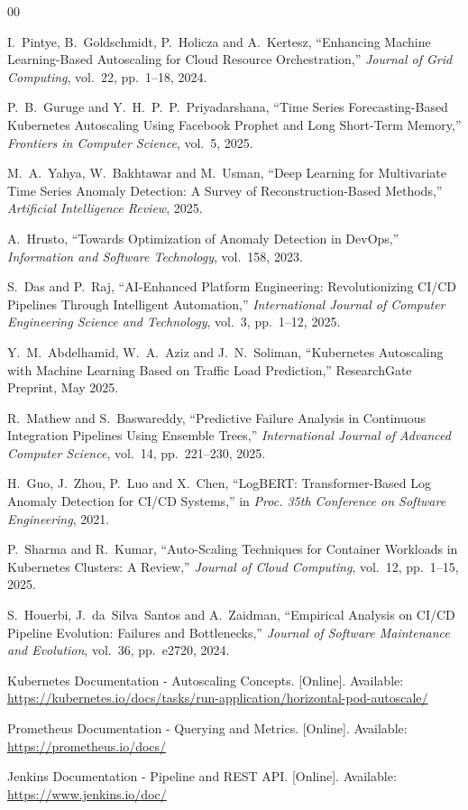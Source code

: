 \documentclass[12pt]{report}
\begin{document}
\begin{thebibliography}{00}

I.~Pintye, B.~Goldschmidt, P.~Holicza and A.~Kertesz,
``Enhancing Machine Learning-Based Autoscaling for Cloud Resource Orchestration,''
\textit{Journal of Grid Computing}, vol.~22, pp.~1--18, 2024.

P.~B.~Guruge and Y.~H.~P.~P.~Priyadarshana,
``Time Series Forecasting-Based Kubernetes Autoscaling Using Facebook Prophet and Long Short-Term Memory,''
\textit{Frontiers in Computer Science}, vol.~5, 2025.

M.~A.~Yahya, W.~Bakhtawar and M.~Usman,
``Deep Learning for Multivariate Time Series Anomaly Detection: A Survey of Reconstruction-Based Methods,''
\textit{Artificial Intelligence Review}, 2025.

A.~Hrusto,
``Towards Optimization of Anomaly Detection in DevOps,''
\textit{Information and Software Technology}, vol.~158, 2023.

S.~Das and P.~Raj,
``AI-Enhanced Platform Engineering: Revolutionizing CI/CD Pipelines Through Intelligent Automation,''
\textit{International Journal of Computer Engineering Science and Technology}, vol.~3, pp.~1--12, 2025.

Y.~M.~Abdelhamid, W.~A.~Aziz and J.~N.~Soliman,
``Kubernetes Autoscaling with Machine Learning Based on Traffic Load Prediction,''
ResearchGate Preprint, May 2025.

R.~Mathew and S.~Baswareddy,
``Predictive Failure Analysis in Continuous Integration Pipelines Using Ensemble Trees,''
\textit{International Journal of Advanced Computer Science}, vol.~14, pp.~221--230, 2025.

H.~Guo, J.~Zhou, P.~Luo and X.~Chen,
``LogBERT: Transformer-Based Log Anomaly Detection for CI/CD Systems,''
in \textit{Proc. 35th Conference on Software Engineering}, 2021.

P.~Sharma and R.~Kumar,
``Auto-Scaling Techniques for Container Workloads in Kubernetes Clusters: A Review,''
\textit{Journal of Cloud Computing}, vol.~12, pp.~1--15, 2025.

S.~Houerbi, J.~da~Silva~Santos and A.~Zaidman,
``Empirical Analysis on CI/CD Pipeline Evolution: Failures and Bottlenecks,''
\textit{Journal of Software Maintenance and Evolution}, vol.~36, pp.~e2720, 2024.

Kubernetes Documentation -  Autoscaling Concepts.
[Online]. Available: \url{https://kubernetes.io/docs/tasks/run-application/horizontal-pod-autoscale/}

Prometheus Documentation - Querying and Metrics.
[Online]. Available: \url{https://prometheus.io/docs/}

Jenkins Documentation - Pipeline and REST API.
[Online]. Available: \url{https://www.jenkins.io/doc/}

\end{thebibliography}
\end{document}
